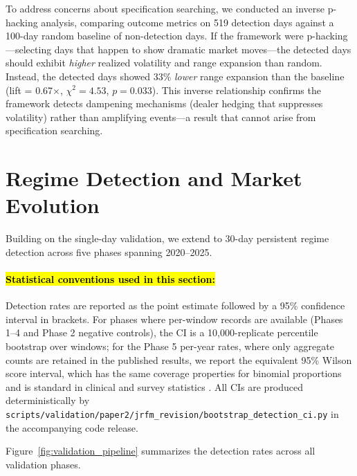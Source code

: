 \documentclass[jrfm,article,accept,moreauthors,pdftex]{Definitions/mdpi}
\begin{document}
To address concerns about specification searching, we conducted an inverse p-hacking analysis, comparing outcome metrics on 519 detection days against a 100-day random baseline of non-detection days. If the framework were p-hacking---selecting days that happen to show dramatic market moves---the detected days should exhibit \textit{higher} realized volatility and range expansion than random. Instead, the detected days showed 33\% \textit{lower} range expansion than the baseline (lift = 0.67$\times$, $\chi^2 = 4.53$, $p = 0.033$). This inverse relationship confirms the framework detects dampening mechanisms (dealer hedging that suppresses volatility) rather than amplifying events---a result that cannot arise from specification searching.



\section{Regime Detection and Market Evolution}
\label{sec:regime}

Building on the single-day validation, we extend to 30-day persistent regime detection across five phases spanning 2020--2025.

\paragraph{\hl{Statistical conventions used in this section:}} %
Detection rates are reported as the point estimate followed by a 95\%
confidence interval in brackets. For phases where per-window records
are available (Phases 1--4 and Phase 2 negative controls), the CI is
a 10{,}000-replicate percentile bootstrap over windows; for the Phase 5
per-year rates, where only aggregate counts are retained in the published
results, we report the equivalent 95\% Wilson score interval, which has
the same coverage properties for binomial proportions and is standard in
clinical and survey statistics \citep{brown2001interval}. All CIs are
produced deterministically by
\texttt{scripts/validation/paper2/jrfm\_revision/bootstrap\_detection\_ci.py}
in the accompanying code release.

Figure~\ref{fig:validation_pipeline} summarizes the detection rates across all validation phases.
\end{document}
